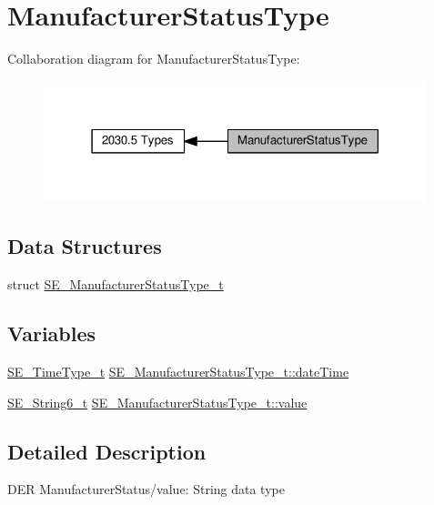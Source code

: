 \hypertarget{group__ManufacturerStatusType}{}\section{Manufacturer\+Status\+Type}
\label{group__ManufacturerStatusType}
Collaboration diagram for Manufacturer\+Status\+Type\+:\nopagebreak
\begin{figure}[H]
\begin{center}
\leavevmode
\includegraphics[width=316pt]{group__ManufacturerStatusType}
\end{center}
\end{figure}
\subsection*{Data Structures}
\begin{DoxyCompactItemize}
\item 
struct \hyperlink{structSE__ManufacturerStatusType__t}{S\+E\+\_\+\+Manufacturer\+Status\+Type\+\_\+t}
\end{DoxyCompactItemize}
\subsection*{Variables}
\begin{DoxyCompactItemize}
\item 
\hyperlink{group__TimeType_ga6fba87a5b57829b4ff3f0e7638156682}{S\+E\+\_\+\+Time\+Type\+\_\+t} \hyperlink{group__ManufacturerStatusType_gad0313c40eccb3f4b5e5fb405eeb9d470}{S\+E\+\_\+\+Manufacturer\+Status\+Type\+\_\+t\+::date\+Time}
\item 
\hyperlink{group__String6_gaabaf8635c2aa9b276e2b92509ddfa136}{S\+E\+\_\+\+String6\+\_\+t} \hyperlink{group__ManufacturerStatusType_ga34c8afb6151ae57d70428b168d40e1ac}{S\+E\+\_\+\+Manufacturer\+Status\+Type\+\_\+t\+::value}
\end{DoxyCompactItemize}


\subsection{Detailed Description}
D\+ER Manufacturer\+Status/value\+: String data type 

